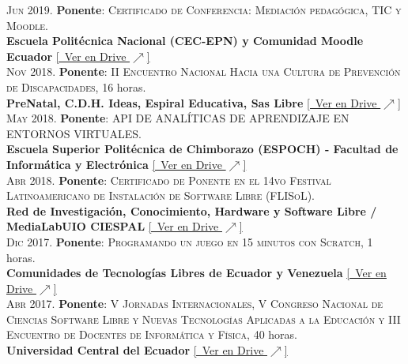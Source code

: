 \documentclass[a4paper]{article}
\begin{document}
\textsc{Jun} 2019. \textbf{Ponente}: \textsc{Certificado de Conferencia: Mediación pedagógica, TIC y Moodle}.\\
\textbf{Escuela Politécnica Nacional (CEC-EPN) y Comunidad Moodle Ecuador} \small \href{https://drive.google.com/file/d/1O6Nfag8pVOnyahiB76KDsbkzAEgOzPjG/view}{[\faGoogleDrive~Ver en Drive $\nearrow$]} \\[4pt]

\textsc{Nov} 2018. \textbf{Ponente}: \textsc{II Encuentro Nacional Hacia una Cultura de Prevención de Discapacidades}, 16 horas.\\
\textbf{PreNatal, C.D.H. Ideas, Espiral Educativa, Sas Libre} \small \href{https://drive.google.com/file/d/1xSsmJVI-ARP92F1u88MrKRAUoplwHAoj/view}{[\faGoogleDrive~Ver en Drive $\nearrow$]} \\[4pt]

\textsc{May} 2018. \textbf{Ponente}: \textsc{API DE ANALÍTICAS DE APRENDIZAJE EN ENTORNOS VIRTUALES}.\\
\textbf{Escuela Superior Politécnica de Chimborazo (ESPOCH) - Facultad de Informática y Electrónica} \small \href{https://drive.google.com/file/d/1tfKzk31G1Xx1jniL3ETNND11VmOPokKv/view}{[\faGoogleDrive~Ver en Drive $\nearrow$]} \\[4pt]

\textsc{Abr} 2018. \textbf{Ponente}: \textsc{Certificado de Ponente en el 14vo Festival Latinoamericano de Instalación de Software Libre (FLISoL)}.\\
\textbf{Red de Investigación, Conocimiento, Hardware y Software Libre / MediaLabUIO CIESPAL} \small \href{https://drive.google.com/file/d/1QzR-WUDae0rjEqAqcfeN7Wer2gTcDXHx/view}{[\faGoogleDrive~Ver en Drive $\nearrow$]} \\[4pt]

\textsc{Dic} 2017. \textbf{Ponente}: \textsc{Programando un juego en 15 minutos con Scratch}, 1 horas.\\
\textbf{Comunidades de Tecnologías Libres de Ecuador y Venezuela} \small \href{https://drive.google.com/file/d/1P0IhgyfqZdHc4NAYVFFyYzDucrQp3s7J/view}{[\faGoogleDrive~Ver en Drive $\nearrow$]} \\[4pt]

\textsc{Abr} 2017. \textbf{Ponente}: \textsc{V Jornadas Internacionales, V Congreso Nacional de Ciencias Software Libre y Nuevas Tecnologías Aplicadas a la Educación y III Encuentro de Docentes de Informática y Física}, 40 horas.\\
\textbf{Universidad Central del Ecuador} \small \href{https://drive.google.com/file/d/1xOISb2ckN-MaCctqJuxBCo9ma6Dxftl0/view}{[\faGoogleDrive~Ver en Drive $\nearrow$]} \\[4pt]
\end{document}
